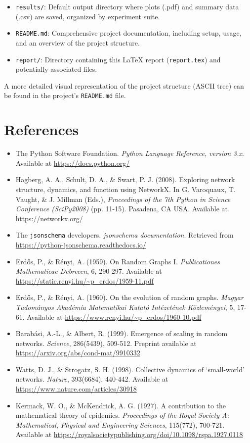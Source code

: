 \documentclass[12pt]{article}
\begin{document}
\begin{itemize}
\begin{itemize}
  \end{itemize}
  
  \item \texttt{results/}: Default output directory where plots (.pdf) and summary data (.csv) are saved, organized by experiment suite.
  
  \item \texttt{README.md}: Comprehensive project documentation, including setup, usage, and an overview of the project structure.
  
  \item \texttt{report/}: Directory containing this LaTeX report (\texttt{report.tex}) and potentially associated files.
\end{itemize}

A more detailed visual representation of the project structure (ASCII tree) can be found in the project's \texttt{README.md} file.

\section*{References}
\begin{itemize}
    \item The Python Software Foundation. \textit{Python Language Reference, version 3.x}. Available at \url{https://docs.python.org/}
    \item Hagberg, A. A., Schult, D. A., \& Swart, P. J. (2008). Exploring network structure, dynamics, and function using NetworkX. In G. Varoquaux, T. Vaught, \& J. Millman (Eds.), \textit{Proceedings of the 7th Python in Science Conference (SciPy2008)} (pp. 11-15). Pasadena, CA USA. Available at \url{https://networkx.org/}
    \item The \texttt{jsonschema} developers. \textit{jsonschema documentation}. Retrieved from \url{https://python-jsonschema.readthedocs.io/}
    \item Erdős, P., \& Rényi, A. (1959). On Random Graphs I. \textit{Publicationes Mathematicae Debrecen}, 6, 290-297. Available at \url{https://static.renyi.hu/~p_erdos/1959-11.pdf}
    \item Erdős, P., \& Rényi, A. (1960). On the evolution of random graphs. \textit{Magyar Tudományos Akadémia Matematikai Kutató Intézetének Közleményei}, 5, 17-61. Available at \url{https://www.renyi.hu/~p_erdos/1960-10.pdf}
    \item Barabási, A.-L., \& Albert, R. (1999). Emergence of scaling in random networks. \textit{Science}, 286(5439), 509-512. Preprint available at \url{https://arxiv.org/abs/cond-mat/9910332}
    \item Watts, D. J., \& Strogatz, S. H. (1998). Collective dynamics of ‘small-world’ networks. \textit{Nature}, 393(6684), 440-442. Available at \url{https://www.nature.com/articles/30918}
    \item Kermack, W. O., \& McKendrick, A. G. (1927). A contribution to the mathematical theory of epidemics. \textit{Proceedings of the Royal Society A: Mathematical, Physical and Engineering Sciences}, 115(772), 700-721. Available at \url{https://royalsocietypublishing.org/doi/10.1098/rspa.1927.0118}
\end{itemize}
\end{document}
